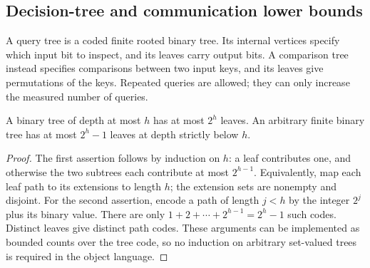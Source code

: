 \subsection{Decision-tree and communication lower bounds}

A query tree is a coded finite rooted binary tree. Its internal vertices
specify which input bit to inspect, and its leaves carry output bits.
A comparison tree instead specifies comparisons between two input keys,
and its leaves give permutations of the keys. Repeated queries are
allowed; they can only increase the measured number of queries.

\begin{lemma}\label{thm:R14}
A binary tree of depth at most $h$ has at most $2^h$ leaves. An arbitrary
finite binary tree has at most $2^h-1$ leaves at depth strictly below $h$.
\end{lemma}
\begin{proof}
The first assertion follows by induction on $h$: a leaf contributes one,
and otherwise the two subtrees each contribute at most $2^{h-1}$.
Equivalently, map each leaf path to its extensions to length $h$; the
extension sets are nonempty and disjoint. For the second assertion,
encode a path of length $j<h$ by the integer $2^j$ plus its binary value.
There are only $1+2+\cdots+2^{h-1}=2^h-1$ such codes. Distinct leaves
give distinct path codes. These arguments can be implemented as bounded
counts over the tree code, so no induction on arbitrary set-valued trees
is required in the object language.
\end{proof}

